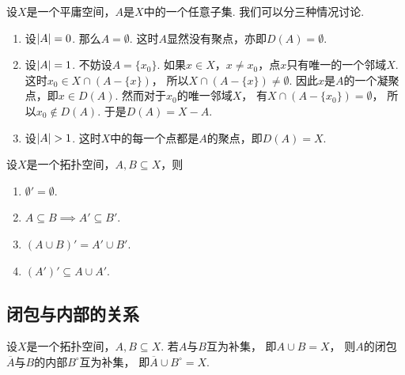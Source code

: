 \begin{example}[平庸空间中的聚点]\label{example:拓扑学.平庸空间中的聚点}
设\(X\)是一个平庸空间，\(A\)是\(X\)中的一个任意子集.
我们可以分三种情况讨论.
\begin{enumerate}
	\item 设\(\abs{A} = 0\).
	那么\(A = \emptyset\).
	这时\(A\)显然没有聚点，亦即\(D(A) = \emptyset\).

	\item 设\(\abs{A} = 1\).
	不妨设\(A = \{x_0\}\).
	如果\(x \in X\)，\(x \neq x_0\)，点\(x\)只有唯一的一个邻域\(X\).
	这时\(x_0 \in X \cap (A - \{x\})\)，
	所以\(X \cap (A - \{x\}) \neq \emptyset\).
	因此\(x\)是\(A\)的一个凝聚点，即\(x \in D(A)\).
	然而对于\(x_0\)的唯一邻域\(X\)，
	有\(X \cap (A - \{x_0\}) = \emptyset\)，
	所以\(x_0 \notin D(A)\).
	于是\(D(A) = X - A\).

	\item 设\(\abs{A} > 1\).
	这时\(X\)中的每一个点都是\(A\)的聚点，即\(D(A) = X\).
\end{enumerate}
\end{example}

\begin{theorem}
设\(X\)是一个拓扑空间，\(A,B \subseteq X\)，则
\begin{enumerate}
	\item \(\emptyset' = \emptyset\).
	\item \(A \subseteq B \implies A' \subseteq B'\).
	\item \((A \cup B)' = A' \cup B'\).
	\item \((A')' \subseteq A \cup A'\).
\end{enumerate}
\end{theorem}

\subsection{闭包与内部的关系}
\begin{theorem}
设\(X\)是一个拓扑空间，\(A,B \subseteq X\).
若\(A\)与\(B\)互为补集，
即\(A \cup B = X\)，
则\(A\)的闭包\(\overline{A}\)与\(B\)的内部\(B^\circ\)互为补集，
即\(\overline{A} \cup B^\circ = X\).
\end{theorem}

